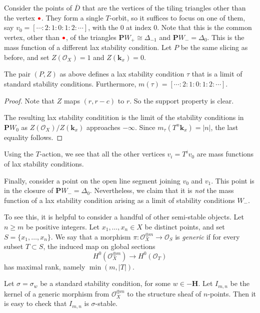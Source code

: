 \documentclass{amsart}
\begin{document}
Consider the points of \(\overline D\) that are the vertices of the tiling triangles other than the vertex \(\textcolor{red}{\bullet}\).
They form a single \(T\)-orbit, so it suffices to focus on one of them, say \(v_0 = [\cdots : 2:1:0:1:2: \cdots]\), with the \(0\) at index \(0\).
Note that this is the common vertex, other than \(\textcolor{red}{\bullet}\), of the triangles \(\mathbf{P}W_{+} \cong \Delta_{-1}\) and \(\mathbf{P}W_- = \Delta_0\).
This is the mass function of a different lax stability condition.
Let \(P\) be the same slicing as before, and set \(Z(\mathcal{O}_X) = 1\) and \(Z(\mathbf{k}_x) = 0\).
\begin{proposition}\label{prop:v0}
  The pair \((P,Z)\) as above defines a lax stability condition \(\tau\) that is a limit of standard stability conditions.
  Furthermore, \(m(\tau) = [\cdots : 2: 1 : 0: 1 : 2: \cdots]\).
\end{proposition}
\begin{proof}
  Note that \(Z\) maps \((r,r-c)\) to \(r\).
  So the support property is clear.

  The resulting lax stability conditition is the limit of the stability conditions in \(\mathbf{P}W_0\) as \(Z(\mathcal{O}_X)/Z(\mathbf{k}_x)\) approaches \(-\infty\).
  Since \(m_{\tau}(T^n \mathbf{k}_x) = |n|\), the last equality follows.
\end{proof}

Using the \(T\)-action, we see that all the other vertices \(v_i = T^iv_0\) are mass functions of lax stability conditions.

Finally, consider a point on the open line segment joining \(v_{0}\) and \(v_{1}\).
This point is in the closure of \(\mathbf{P}W_- = \Delta_0\).
Nevertheless, we claim that it is \emph{not} the mass function of a lax stability condition arising as a limit of stability conditions \(W_-\).

To see this, it is helpful to consider a handful of other semi-stable objects.
Let \(n \geq m\) be positive integers.
Let \(x_1, \dots, x_n \in X\) be distinct points, and set \(S = \{x_1, \dots, x_n\}\).
We say that a morphism \( \pi \colon \mathcal{O}_X^{\oplus m} \to \mathcal{O}_S\) is \emph{generic} if for every subset \(T \subset S\), the induced map on global sections
\[ H^0(\mathcal{O}_X^{\oplus m}) \to H^0(\mathcal{O}_T)\]
has maximal rank, namely \(\min(m, |T|)\).

Let \(\sigma = \sigma_w\) be a standard stability condition, for some \(w \in -\mathbf{H}\).
Let \(I_{m,n}\) be the kernel of a generic morphism from \(\mathcal{O}_X^{\oplus m}\) to the structure sheaf of \(n\)-points.
Then it is easy to check that \(I_{m,n}\) is \(\sigma\)-stable.
\end{document}
